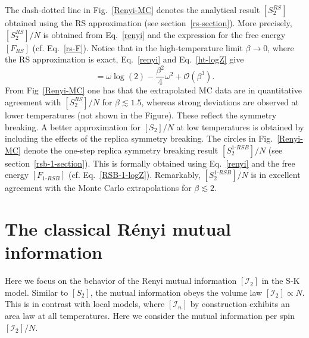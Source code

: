 \documentclass[twocolumn,superscriptaddress,prb,10pt]{revtex4-1}
\begin{document}
The dash-dotted line in Fig.~\ref{Renyi-MC} denotes the analytical result $[S_2^{RS}]$ 
obtained using the RS approximation (see section~\ref{rs-section}). More precisely, 
$[S_2^{RS}]/N$ is obtained from Eq.~\eqref{renyi} and the expression for the free energy 
$[F_{RS}]$ (cf. Eq.~\eqref{rs-F}). Notice that in the 
high-temperature limit $\beta\to0$, where the RS approximation is exact, 
Eq.~\eqref{renyi} and Eq.~\eqref{ht-logZ} give 
%
\begin{equation}
[S^{RS}_2]=\omega\log(2)-\frac{\beta^2}{4}\omega^2+{\mathcal O}(\beta^3).
\end{equation}
%
From Fig~\ref{Renyi-MC} one has that the extrapolated MC data are in quantitative 
agreement with $[S_2^{RS}]/N$ for $\beta\lesssim 1.5$, whereas strong deviations are 
observed at lower temperatures (not shown in the Figure). These reflect the symmetry 
breaking. A better approximation for $[S_2]/N$ at low temperatures is obtained by 
including the effects of the replica symmetry breaking. The circles in Fig.~\ref{Renyi-MC} 
denote the one-step replica symmetry breaking result $[S_2^{1\textrm{-}RSB}]/N$
(see section~\ref{rsb-1-section}). This is formally obtained using Eq.~\eqref{renyi} 
and the free energy $[F_{1\textrm{-}RSB}]$ (cf. Eq.~\eqref{RSB-1-logZ}). Remarkably, 
$[S_2^{1\textrm{-}RSB}]/N$ is in excellent agreement with the Monte Carlo extrapolations 
for $\beta\lesssim 2$. 


\section{The classical R\'enyi mutual information}
\label{I2-section}

Here we focus on the behavior of the Renyi mutual information $[{\mathcal I}_2]$ in 
the S-K model. Similar to $[S_2]$, the mutual information obeys the volume 
law $[{\mathcal I}_2]\propto N$. This is in contrast with local models, where 
$[{\mathcal I}_n]$ by construction exhibits an area law at all temperatures.
Here we consider the mutual information per spin 
$[{\mathcal I}_2]/N$. 
\end{document}
